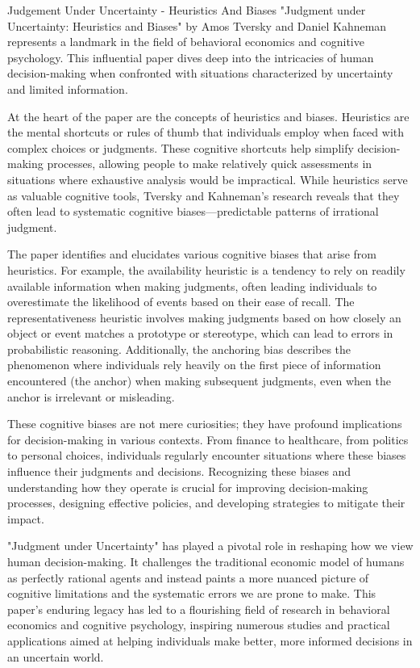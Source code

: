 \begin{notes}{Judgement Under Uncertainty - Heuristics And Biases}
    "Judgment under Uncertainty: Heuristics and Biases" by Amos Tversky and Daniel Kahneman represents a landmark in the field of behavioral economics and cognitive psychology. This influential paper 
    dives deep into the intricacies of human decision-making when confronted with situations characterized by uncertainty and limited information. 

    At the heart of the paper are the concepts of heuristics and biases. Heuristics are the mental shortcuts or rules of thumb that individuals employ when faced with complex choices or judgments. These 
    cognitive shortcuts help simplify decision-making processes, allowing people to make relatively quick assessments in situations where exhaustive analysis would be impractical. While heuristics serve 
    as valuable cognitive tools, Tversky and Kahneman's research reveals that they often lead to systematic cognitive biases—predictable patterns of irrational judgment.

    The paper identifies and elucidates various cognitive biases that arise from heuristics. For example, the availability heuristic is a tendency to rely on readily available information when making 
    judgments, often leading individuals to overestimate the likelihood of events based on their ease of recall. The representativeness heuristic involves making judgments based on how closely an object 
    or event matches a prototype or stereotype, which can lead to errors in probabilistic reasoning. Additionally, the anchoring bias describes the phenomenon where individuals rely heavily on the first 
    piece of information encountered (the anchor) when making subsequent judgments, even when the anchor is irrelevant or misleading.

    These cognitive biases are not mere curiosities; they have profound implications for decision-making in various contexts. From finance to healthcare, from politics to personal choices, individuals 
    regularly encounter situations where these biases influence their judgments and decisions. Recognizing these biases and understanding how they operate is crucial for improving decision-making 
    processes, designing effective policies, and developing strategies to mitigate their impact.

    "Judgment under Uncertainty" has played a pivotal role in reshaping how we view human decision-making. It challenges the traditional economic model of humans as perfectly rational agents and instead 
    paints a more nuanced picture of cognitive limitations and the systematic errors we are prone to make. This paper's enduring legacy has led to a flourishing field of research in behavioral economics 
    and cognitive psychology, inspiring numerous studies and practical applications aimed at helping individuals make better, more informed decisions in an uncertain world.
\end{notes}

